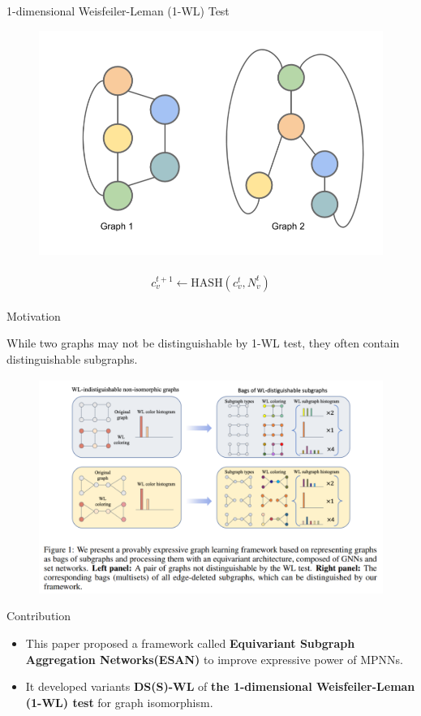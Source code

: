 \documentclass[aspectratio=169,mathserif]{beamer}  %
\newcommand{\tb}{\textbf}
\begin{document}
\begin{frame}{1-dimensional Weisfeiler-Leman (1-WL) Test}

\begin{figure}[t]
\centerline{\includegraphics[width=0.5\linewidth]{figure9.png}}
\end{figure}

\begin{eqnarray*}
\begin{aligned}
c_{v}^{t+1} \gets \text{HASH}(c_{v}^{t}, N_{v}^{t})
\end{aligned}    
\end{eqnarray*}

\end{frame}



\begin{frame}{Motivation}

While two graphs may not be distinguishable by 1-WL test, they often contain distinguishable subgraphs. 

\pause 

\begin{figure}[t]
\centerline{\includegraphics[width=0.7\linewidth]{figure1.png}}
\label{fig1}
\end{figure}

\end{frame}



\begin{frame}{Contribution}

\begin{itemize}
    \item This paper proposed a framework called \tb{Equivariant Subgraph Aggregation Networks(ESAN)} to improve expressive power of MPNNs.
    \item It developed variants \tb{DS(S)-WL} of \tb{the 1-dimensional Weisfeiler-Leman (1-WL) test} for graph isomorphism.
\end{itemize}

\end{frame}
\end{document}
